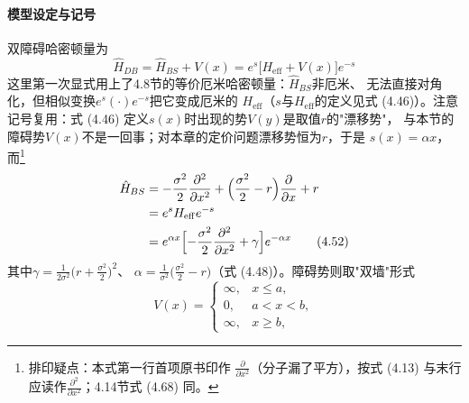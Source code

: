 \paragraph{模型设定与记号}
双障碍哈密顿量为
\begin{equation*}
\hat{H}_{DB}=\hat{H}_{BS}+V(x)=e^{s}\bigl[H_{\mathrm{eff}}+V(x)\bigr]e^{-s}
\tag{4.51}
\end{equation*}
这里第一次显式用上了4.8节的等价厄米哈密顿量：$\hat{H}_{BS}$非厄米、
无法直接对角化，但相似变换$e^{s}(\cdot)e^{-s}$把它变成厄米的
$H_{\mathrm{eff}}$（$s$与$H_{\mathrm{eff}}$的定义见式 (4.46)）。注意
记号复用：式 (4.46) 定义$s(x)$时出现的势$V(y)$是取值$r$的"漂移势"，
与本节的障碍势$V(x)$不是一回事；对本章的定价问题漂移势恒为$r$，于是
$s(x)=\alpha x$，而\footnote{排印疑点：本式第一行首项原书印作
$\frac{\partial}{\partial x^{2}}$（分子漏了平方），按式 (4.13) 与末行
应读作$\frac{\partial^{2}}{\partial x^{2}}$；4.14节式 (4.68) 同。}
\begin{align*}
\hat{H}_{BS}&=-\frac{\sigma^{2}}{2}\frac{\partial^{2}}{\partial x^{2}}
+\Bigl(\frac{\sigma^{2}}{2}-r\Bigr)\frac{\partial}{\partial x}+r\\
&=e^{s}H_{\mathrm{eff}}e^{-s}\\
&=e^{\alpha x}\Bigl[-\frac{\sigma^{2}}{2}\frac{\partial^{2}}{\partial x^{2}}
+\gamma\Bigr]e^{-\alpha x}
\tag{4.52}
\end{align*}
其中$\gamma=\frac{1}{2\sigma^{2}}\bigl(r+\frac{\sigma^{2}}{2}\bigr)^{2}$、
$\alpha=\frac{1}{\sigma^{2}}\bigl(\frac{\sigma^{2}}{2}-r\bigr)$（式
(4.48)）。障碍势则取"双墙"形式
\begin{equation*}
V(x)=
\begin{cases}
\infty, & x\leq a,\\
0, & a<x<b,\\
\infty, & x\geq b,
\end{cases}
\tag{4.53}
\end{equation*}

